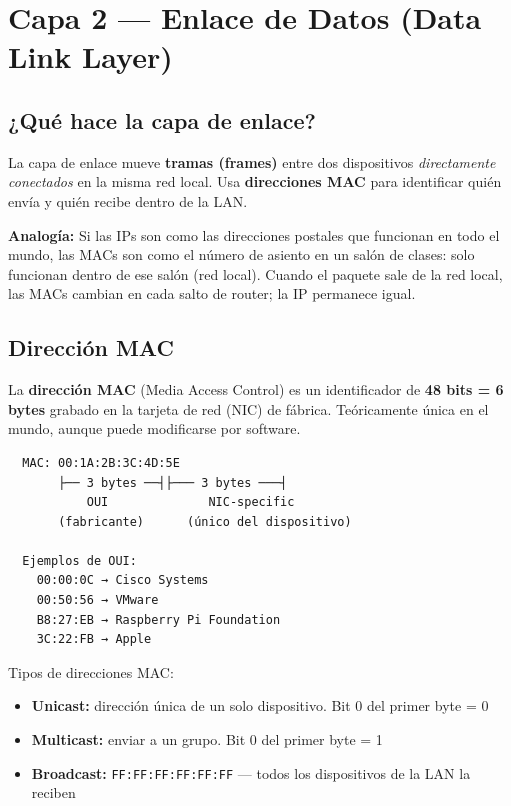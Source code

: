 \chapter{ Capa 2 --- Enlace de Datos (Data Link Layer)}

\section{ ¿Qué hace la capa de enlace?}

\begin{concepto}
La capa de enlace mueve \textbf{tramas (frames)} entre dos dispositivos
\textit{directamente conectados} en la misma red local. Usa \textbf{direcciones
MAC} para identificar quién envía y quién recibe dentro de la LAN.

 \textbf{Analogía:} Si las IPs son como las direcciones
postales que funcionan en todo el mundo, las MACs son como el número de asiento
en un salón de clases: solo funcionan dentro de ese salón (red local).
Cuando el paquete sale de la red local, las MACs cambian en cada salto de router;
la IP permanece igual.
\end{concepto}

\section{ Dirección MAC}

\begin{concepto}
La \textbf{dirección MAC} (Media Access Control) es un identificador de
\textbf{48 bits = 6 bytes} grabado en la tarjeta de red (NIC) de fábrica.
Teóricamente única en el mundo, aunque puede modificarse por software.
\end{concepto}

\begin{lstlisting}
  MAC: 00:1A:2B:3C:4D:5E
       ├── 3 bytes ──┤├─── 3 bytes ───┤
           OUI              NIC-specific
       (fabricante)      (único del dispositivo)

  Ejemplos de OUI:
    00:00:0C → Cisco Systems
    00:50:56 → VMware
    B8:27:EB → Raspberry Pi Foundation
    3C:22:FB → Apple
\end{lstlisting}

Tipos de direcciones MAC:
\begin{itemize}
    \item \textbf{Unicast:} dirección única de un solo dispositivo. Bit 0 del primer byte = 0
    \item \textbf{Multicast:} enviar a un grupo. Bit 0 del primer byte = 1
    \item \textbf{Broadcast:} \texttt{FF:FF:FF:FF:FF:FF} --- todos los dispositivos de la LAN la reciben
\end{itemize}

